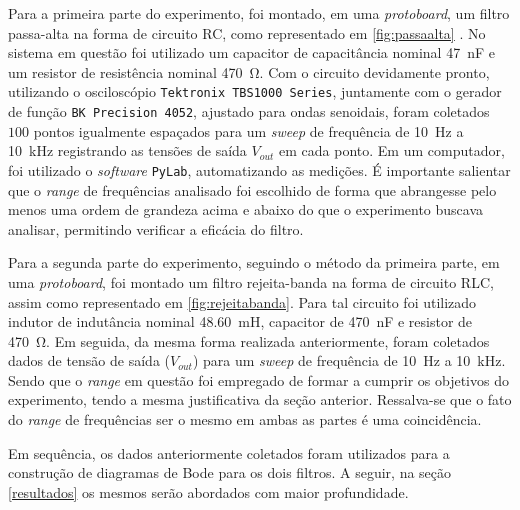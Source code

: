 Para a primeira parte do experimento, foi montado, em uma \textit{protoboard}, um filtro passa-alta na forma de  circuito RC, como representado em \cref{fig:passaalta} . No sistema em questão foi utilizado um capacitor de capacitância nominal \SI{47}{\nano\farad} e um resistor de resistência nominal \SI{470}{\ohm}. Com o circuito devidamente pronto, utilizando o osciloscópio \texttt{Tektronix TBS1000 Series}, juntamente com o gerador de função \texttt{BK Precision 4052}, ajustado para ondas senoidais, foram coletados $100$ pontos igualmente espaçados para um \textit{sweep} de frequência de \SI{10}{\hertz} a \SI{10}{\kilo\hertz} registrando as tensões de saída $V_{out}$ em cada ponto. Em um computador, foi utilizado o \textit{software} \texttt{PyLab}, automatizando as medições. É importante salientar que o \textit{range} de frequências analisado foi escolhido de forma que abrangesse pelo menos uma ordem de grandeza acima e abaixo do que o experimento buscava analisar, permitindo verificar a eficácia do filtro.
\par
Para a segunda parte do experimento, seguindo o método da primeira parte, em uma \textit{protoboard}, foi montado um filtro rejeita-banda na forma de circuito RLC, assim como representado em \ref{fig:rejeitabanda}. Para tal circuito foi utilizado indutor de indutância nominal \SI{48,60}{\milli\henry}, capacitor de \SI{470}{\nano\farad} e resistor de \SI{470}{\ohm}. Em seguida, da mesma forma realizada anteriormente, foram coletados dados de tensão de saída ($V_{out}$) para um \textit{sweep} de frequência de \SI{10}{\hertz} a \SI{10}{\kilo\hertz}. Sendo que o \textit{range} em questão foi empregado de formar a cumprir os objetivos do experimento, tendo a mesma justificativa da seção anterior. Ressalva-se que o fato do \textit{range} de frequências ser o mesmo em ambas as partes é uma coincidência.
\par
Em sequência, os dados anteriormente coletados foram utilizados para a construção de diagramas de Bode para os dois filtros. A seguir, na seção \ref{resultados} os mesmos serão abordados com maior profundidade.

